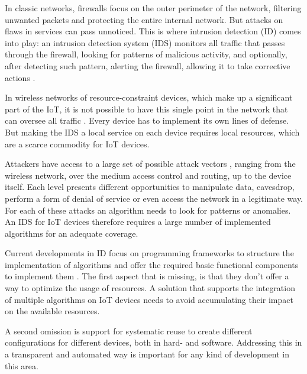 \documentclass[conference]{IEEEtran}
\begin{document}

In classic networks, firewalls focus on the outer perimeter of the network,
filtering unwanted packets and protecting the entire internal network. But
attacks on flaws in services can pass unnoticed. This is where intrusion
detection (ID) comes into play: an intrusion detection system (IDS) monitors
all traffic that passes through the firewall, looking for patterns of malicious
activity, and optionally, after detecting such pattern, alerting the firewall,
allowing it to take corrective actions \cite{denning1987intrusion}.


In wireless networks of resource-constraint devices, which make up a
significant part of the IoT, it is not possible to have this single point in
the network that can oversee all traffic \cite{mishra2004intrusion}. Every
device has to implement its own lines of defense. But making the IDS a local
service on each device requires local resources, which are a scarce commodity
for IoT devices.

Attackers have access to a large set of possible attack vectors
\cite{aschenbruck2012security}, ranging from the wireless network, over the
medium access control and routing, up to the device itself. Each level presents
different opportunities to manipulate data, eavesdrop, perform a form of denial
of service or even access the network in a legitimate way. For each of these
attacks an algorithm needs to look for patterns or anomalies. An IDS for IoT
devices therefore requires a large number of implemented algorithms for an
adequate coverage.


Current developments in ID focus on programming frameworks to structure the
implementation of algorithms \cite{valero2012di} and offer the required basic
functional components to implement them \cite{krontiris2008lidea}. The first
aspect that is missing, is that they don't offer a way to optimize the usage of
resources. A solution that supports the integration of multiple algorithms on
IoT devices needs to avoid accumulating their impact on the available resources.

A second omission is support for systematic reuse to create different
configurations for different devices, both in hard- and software. Addressing
this in a transparent and automated way is important for any kind of
development in this area.
\end{document}
